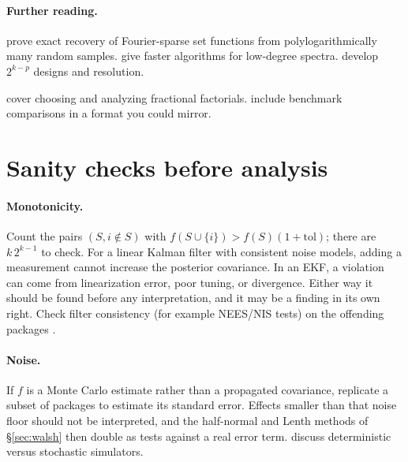 \documentclass[11pt]{article}
\begin{document}
\paragraph{Further reading.}
\begin{reading}
  \item[Mathematics.] \textcite{StobbeKrause2012} prove exact recovery of Fourier-sparse set functions from polylogarithmically many random samples.
        \textcite{Amrollahi2019} give faster algorithms for low-degree spectra.
        \textcite{BoxHunter1961} develop $2^{k-p}$ designs and resolution.
  \item[Applying it.] \textcite[Ch.~5]{WuHamada2009} cover choosing and analyzing fractional factorials.
        \textcite{BaptistaPoloczek2018} include benchmark comparisons in a format you could mirror.
\end{reading}

\section{Sanity checks before analysis}\label{sec:sanity}

\paragraph{Monotonicity.}
Count the pairs $(S,i\notin S)$ with $f(S\cup\{i\})>f(S)(1+\text{tol})$; there are $k\,2^{k-1}$ to check.
For a linear Kalman filter with consistent noise models, adding a measurement cannot increase the posterior covariance.
In an EKF, a violation can come from linearization error, poor tuning, or divergence.
Either way it should be found before any interpretation, and it may be a finding in its own right.
Check filter consistency (for example NEES/NIS tests) on the offending packages \parencite[Ch.~5]{BarShalom2001}.

\paragraph{Noise.}
If $f$ is a Monte Carlo estimate rather than a propagated covariance, replicate a subset of packages to estimate its standard error.
Effects smaller than that noise floor should not be interpreted, and the half-normal and Lenth methods of \S\ref{sec:walsh} then double as tests against a real error term.
\textcite{Santner2018} discuss deterministic versus stochastic simulators.
\end{document}
